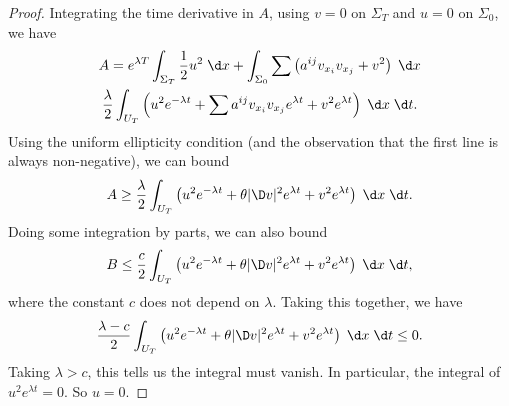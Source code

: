 \documentclass[a4paper]{article}
\begin{document}
\begin{proof}
  Integrating the time derivative in $A$, using $v = 0$ on $\Sigma_T$ and $u = 0$ on $\Sigma_0$, we have
  \begin{multline*}
    A = e^{\lambda T} \int_{\Sigma_T} \frac{1}{2} u^2 \;\d x + \int_{\Sigma_0} \sum \left(a^{ij} v_{x_i} v_{x_j} + v^2\right) \;\d x\\
    \frac{\lambda}{2} \int_{U_T}\left(u^2 e^{-\lambda t} + \sum a^{ij} v_{x_i} v_{x_j} e^{\lambda t} + v^2 e^{\lambda t}\right) \;\d x\;\d t.
  \end{multline*}
  Using the uniform ellipticity condition (and the observation that the first line is always non-negative), we can bound
  \[
    A \geq \frac{\lambda}{2} \int_{U_T} \left(u^2 e^{-\lambda t} + \theta |\D v|^2 e^{\lambda t} + v^2 e^{\lambda t}\right)\;\d x\;\d t.
  \]
  Doing some integration by parts, we can also bound
  \[
    B \leq \frac{c}{2} \int_{U_T} \left(u^2 e^{-\lambda t} + \theta |\D v|^2 e^{\lambda t} + v^2 e^{\lambda t}\right)\;\d x\;\d t,
  \]
  where the constant $c$ does not depend on $\lambda$. Taking this together, we have
  \[
    \frac{\lambda - c}{2} \int_{U_T} \left(u^2 e^{-\lambda t} + \theta |\D v|^2 e^{\lambda t} + v^2 e^{\lambda t}\right)\;\d x\;\d t \leq 0.
  \]
  Taking $\lambda > c$, this tells us the integral must vanish. In particular, the integral of $u^2 e^{\lambda t} = 0$. So $u = 0$.
\end{proof}
\end{document}
